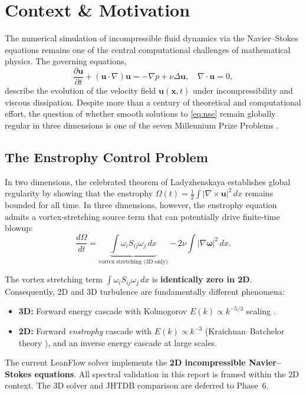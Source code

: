 \documentclass[11pt,a4paper,twoside]{article}
\begin{document}
\tableofcontents
\newpage

\section{Context \& Motivation}
\label{sec:context}

The numerical simulation of incompressible fluid dynamics via the Navier--Stokes equations remains one of the central computational challenges of mathematical physics.
The governing equations,
\begin{equation}
\frac{\partial \mathbf{u}}{\partial t} + (\mathbf{u} \cdot \nabla)\mathbf{u} = -\nabla p + \nu \Delta \mathbf{u}, \quad \nabla \cdot \mathbf{u} = 0,
\label{eq:nse}
\end{equation}
describe the evolution of the velocity field $\mathbf{u}(\mathbf{x}, t)$ under incompressibility and viscous dissipation.
Despite more than a century of theoretical and computational effort, the question of whether smooth solutions to \eqref{eq:nse} remain globally regular in three dimensions is one of the seven Millennium Prize Problems \cite{fefferman2006existence}.

\subsection{The Enstrophy Control Problem}

In two dimensions, the celebrated theorem of Ladyzhenskaya \cite{ladyzhenskaya1969} establishes global regularity by showing that the enstrophy $\Omega(t) = \frac{1}{2}\int |\nabla \times \mathbf{u}|^2\,dx$ remains bounded for all time.
In three dimensions, however, the enstrophy equation admits a vortex-stretching source term that can potentially drive finite-time blowup:
\begin{equation}
\frac{d\Omega}{dt} = \underbrace{\int \omega_i S_{ij} \omega_j\,dx}_{\text{vortex stretching (3D only)}} - 2\nu \int |\nabla \boldsymbol{\omega}|^2\,dx.
\label{eq:enstrophy3d}
\end{equation}

\begin{peerreview}[title={PR1-\S1A: 2D vs.\ 3D Turbulence}]
The vortex stretching term $\int \omega_i S_{ij} \omega_j\,dx$ is \textbf{identically zero in 2D}. Consequently, 2D and 3D turbulence are fundamentally different phenomena:
\begin{itemize}
\item \textbf{3D:} Forward energy cascade with Kolmogorov $E(k) \propto k^{-5/3}$ scaling \cite{kolmogorov1941}.
\item \textbf{2D:} Forward \emph{enstrophy} cascade with $E(k) \propto k^{-3}$ (Kraichnan--Batchelor theory \cite{kraichnan1967,batchelor1969}), and an inverse energy cascade at large scales.
\end{itemize}
The current LeanFlow solver implements the \textbf{2D incompressible Navier--Stokes equations}. All spectral validation in this report is framed within the 2D context. The 3D solver and JHTDB comparison are deferred to Phase~6.
\end{peerreview}
\end{document}
